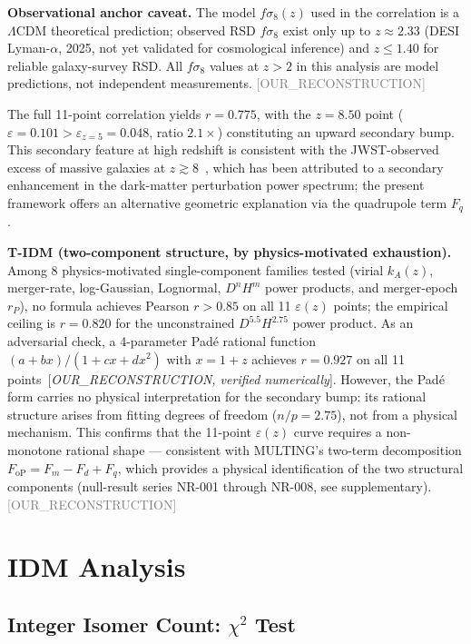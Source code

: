 \documentclass[twocolumn,prd,amsmath,amssymb,floatfix]{revtex4-2}
\newcommand{\reconstruction}{\textcolor{gray}{\small[OUR\_RECONSTRUCTION]}}
\begin{document}
\textbf{Observational anchor caveat.}
The model $f\sigma_8(z)$ used in the correlation is a $\Lambda$CDM theoretical
prediction; observed RSD $f\sigma_8$ exist only up to $z \approx 2.33$
(DESI Lyman-$\alpha$, 2025, not yet validated for cosmological inference)
and $z \le 1.40$ for reliable galaxy-survey RSD.
All $f\sigma_8$ values at $z > 2$ in this analysis are model predictions,
not independent measurements.
\reconstruction

The full 11-point correlation yields $r = 0.775$, with the $z = 8.50$
point ($\varepsilon = 0.101 > \varepsilon_{z=5} = 0.048$, ratio $2.1\times$)
constituting an upward secondary bump.
This secondary feature at high redshift is consistent with the JWST-observed
excess of massive galaxies at $z \gtrsim 8$~\cite{tkachev2023}, which has been
attributed to a secondary enhancement in the dark-matter perturbation power
spectrum; the present framework offers an alternative geometric explanation via
the quadrupole term $F_q$.

\textbf{T-IDM (two-component structure, by physics-motivated exhaustion).}
Among 8 physics-motivated single-component families tested (virial $k_A(z)$,
merger-rate, log-Gaussian, Lognormal, $D^n H^m$ power products, and
merger-epoch $r_P$), no formula achieves Pearson $r > 0.85$ on all 11
$\varepsilon(z)$ points; the empirical ceiling is $r = 0.820$ for the
unconstrained $D^{5.5} H^{2.75}$ power product.
As an adversarial check, a 4-parameter Pad\'{e} rational function
$(a + bx)/(1 + cx + dx^2)$ with $x = 1+z$ achieves $r = 0.927$
on all 11 points~[\textit{OUR\_RECONSTRUCTION, verified numerically}].
However, the Pad\'{e} form carries no physical interpretation for the
secondary bump: its rational structure arises from fitting
degrees of freedom ($n/p = 2.75$), not from a physical mechanism.
This confirms that the 11-point $\varepsilon(z)$ curve requires a
non-monotone rational shape — consistent with MULTING's two-term
decomposition $F_\mathrm{oP} = F_m - F_d + F_q$, which provides a
physical identification of the two structural components (null-result
series NR-001 through NR-008, see supplementary).
\reconstruction

\section{IDM Analysis}
\label{sec:idm}

\subsection{Integer Isomer Count: $\chi^2$ Test}
\label{ssec:chi2}
\end{document}
